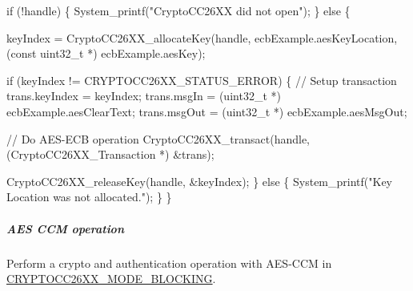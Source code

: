 \begin{DoxyCode}
\textcolor{keywordflow}{if} (!handle) \{
    System\_printf(\textcolor{stringliteral}{"CryptoCC26XX did not open"});
\} \textcolor{keywordflow}{else} \{

    keyIndex = CryptoCC26XX_allocateKey(handle, ecbExample.aesKeyLocation,
                                         (\textcolor{keyword}{const} uint32\_t *) ecbExample.aesKey);

    \textcolor{keywordflow}{if} (keyIndex != CRYPTOCC26XX_STATUS_ERROR) \{
        \textcolor{comment}{// Setup transaction}
        trans.keyIndex         = keyIndex;
        trans.msgIn            = (uint32\_t *) ecbExample.aesClearText;
        trans.msgOut           = (uint32\_t *) ecbExample.aesMsgOut;

        \textcolor{comment}{// Do AES-ECB operation}
        CryptoCC26XX_transact(handle, (CryptoCC26XX_Transaction *) &trans);

        CryptoCC26XX_releaseKey(handle, &keyIndex);
    \} \textcolor{keywordflow}{else} \{
        System\_printf(\textcolor{stringliteral}{"Key Location was not allocated."});
    \}
\}
\end{DoxyCode}


\subparagraph*{A\+E\+S C\+C\+M operation}

Perform a crypto and authentication operation with A\+E\+S-\/\+C\+C\+M in \hyperlink{_crypto_c_c26_x_x_8h_abf86c8ac428559f00fed3299d439e2cdaf0a9faf35a12d014c5f3a475906a3373}{C\+R\+Y\+P\+T\+O\+C\+C26\+X\+X\+\_\+\+M\+O\+D\+E\+\_\+\+B\+L\+O\+C\+K\+I\+N\+G}.


